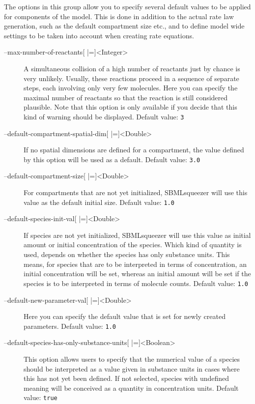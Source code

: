 The options in this group allow you to specify several default values to be
applied for components of the model.
This is done in addition to the actual rate law generation, such as the default
compartment size etc., and to define model wide settings to be taken into
account when creating rate equations.
\begin{description}
\item[--max-number-of-reactants{[} |={]}<Integer>]
  A simultaneous collision of a high number of reactants just by
  chance is very unlikely. Usually, these reactions proceed in
  a sequence of separate steps, each involving only very few molecules.
  Here you can specify the maximal number of reactants so that
  the reaction is still considered plausible. 
  Note that this option is only available if
  you decide that this kind of warning should be displayed.
  Default value: \texttt{3}

\item[--default-compartment-spatial-dim{[} |={]}<Double>]
  If no spatial dimensions are defined for a compartment, the value
  defined by this option will be used as a default.
  Default value: \texttt{3.0}

\item[--default-compartment-size{[} |={]}<Double>]
  For compartments that are not yet initialized, SBMLsqueezer will
  use this value as the default initial size.
  Default value: \texttt{1.0}

\item[--default-species-init-val{[} |={]}<Double>]
  If species are not yet initialized, SBMLsqueezer will use this
  value as initial amount or initial concentration of the species.
  Which kind of quantity is used, depends on whether the species
  has only substance units. This means, for species that are to
  be interpreted in terms of concentration, an initial concentration
  will be set, whereas an initial amount will be set if the species
  is to be interpreted in terms of molecule counts.
  Default value: \texttt{1.0}

\item[--default-new-parameter-val{[} |={]}<Double>]
  Here you can specify the default value that is set for newly
  created parameters.
  Default value: \texttt{1.0}

\item[--default-species-has-only-substance-units{[} |={]}<Boolean>]
  This option allows users to specify that the numerical value
  of a species should be interpreted as a value given in substance
  units in cases where this has not yet been defined. If not selected,
  species with undefined meaning will be conceived as a quantity
  in concentration units.
  Default value: \texttt{true}


\end{description}
